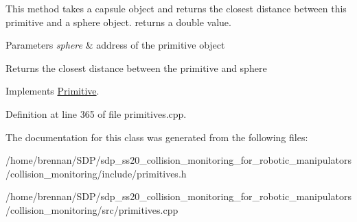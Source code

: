 This method takes a capsule object and returns the closest distance between this primitive and a sphere object. returns a double value.


\begin{DoxyParams}{Parameters}
{\em sphere} & address of the primitive object \\
\hline
\end{DoxyParams}
\begin{DoxyReturn}{Returns}
the closest distance between the primitive and sphere 
\end{DoxyReturn}


Implements \hyperlink{class_primitive_adaac4fc4fedf9cd76d4eb9c77e9ae560}{Primitive}.



Definition at line 365 of file primitives.\+cpp.



The documentation for this class was generated from the following files\+:\begin{DoxyCompactItemize}
\item 
/home/brennan/\+S\+D\+P/sdp\+\_\+ss20\+\_\+collision\+\_\+monitoring\+\_\+for\+\_\+robotic\+\_\+manipulators/collision\+\_\+monitoring/include/primitives.\+h\item 
/home/brennan/\+S\+D\+P/sdp\+\_\+ss20\+\_\+collision\+\_\+monitoring\+\_\+for\+\_\+robotic\+\_\+manipulators/collision\+\_\+monitoring/src/primitives.\+cpp\end{DoxyCompactItemize}
